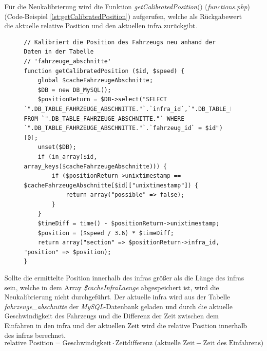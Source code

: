 Für die Neukalibrierung wird die Funktion \textit{getCalibratedPosition$($$)$} (\textit{functions.php}) (Code-Beispiel \ref{lst:getCalibratedPosition}) aufgerufen, welche als Rückgabewert die aktuelle relative Position und den aktuellen \ac{infra} zurückgibt.
\begin{figure}
\begin{lstlisting}[caption={\textit{getCalibratedPosition$($$)$} (\textit{functions\_db.php})},captionpos=b,label={lst:getCalibratedPosition}]
// Kalibriert die Position des Fahrzeugs neu anhand der Daten in der Tabelle
// 'fahrzeuge_abschnitte'
function getCalibratedPosition ($id, $speed) {
	global $cacheFahrzeugeAbschnitte;
	$DB = new DB_MySQL();
	$positionReturn = $DB->select("SELECT `".DB_TABLE_FAHRZEUGE_ABSCHNITTE."`.`infra_id`,`".DB_TABLE_FAHRZEUGE_ABSCHNITTE."`.`unixtimestamp` FROM `".DB_TABLE_FAHRZEUGE_ABSCHNITTE."` WHERE `".DB_TABLE_FAHRZEUGE_ABSCHNITTE."`.`fahrzeug_id` = $id")[0];
	unset($DB);
	if (in_array($id, array_keys($cacheFahrzeugeAbschnitte))) {
		if ($positionReturn->unixtimestamp == $cacheFahrzeugeAbschnitte[$id]["unixtimestamp"]) {
			return array("possible" => false);
		}
	}
	$timeDiff = time() - $positionReturn->unixtimestamp;
	$position = ($speed / 3.6) * $timeDiff;
	return array("section" => $positionReturn->infra_id, "position" => $position);
}
\end{lstlisting}
\end{figure}

Sollte die ermittelte Position innerhalb des \ac{infra}s größer als die Länge des \ac{infra}s sein, welche in dem Array \textit{\$cacheInfraLaenge} abgespeichert ist, wird die Neukalibrierung nicht durchgeführt. Der aktuelle \ac{infra} wird aus der Tabelle \textit{fahrzeuge\_abschnitte} der \textit{MySQL}-Datenbank geladen und durch die aktuelle Geschwindigkeit des Fahrzeugs und die Differenz der Zeit zwischen dem Einfahren in den \ac{infra} und der aktuellen Zeit wird die relative Position innerhalb des \ac{infra}s berechnet.
\begin{equation*}
\textrm{relative Position} = \textrm{Geschwindigkeit} \cdot \textrm{Zeitdifferenz (aktuelle Zeit} - \textrm{Zeit des Einfahrens)}
\end{equation*}
